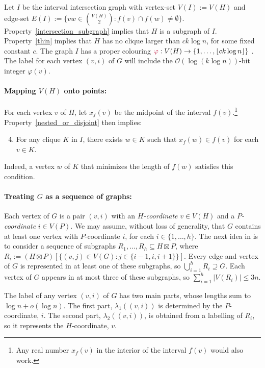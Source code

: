 \documentclass{patmorin}
\makeatletter
\renewcommand{\le}{\leqslant}
\newcommand{\defin}[1]{\emph{\textcolor{brightmaroon}{#1}}}
\def\mathcolor#1#{\@mathcolor{#1}}
\def\@mathcolor#1#2#3{%
  \protect\leavevmode
  \begingroup
    \color#1{#2}#3%
  \endgroup
}
\newcommand{\mathdefin}[1]{\mathcolor{brightmaroon}{#1}}
\newcommand{\Oh}{\calO}
\newcommand{\calO}{\mathcal{O}}
\makeatother
\begin{document}
  Let $I$ be the interval intersection graph with vertex-set $V(I):=V(H)$ and edge-set $E(I):=\{vw\in\binom{V(H)}{2}:f(v)\cap f(w)\neq\emptyset\}$.
  Property~\ref{intersection_subgraph} implies that $H$ is a subgraph of $I$. Property~\ref{thin} implies that $H$ has no clique larger than $ck\log n$, for some fixed constant $c$.
  The graph $I$ has a proper colouring $\mathdefin{\varphi}:V(H)\to\{1,\ldots,\lfloor ck\log n\rfloor\}$ \cite{gilmore.hoffman:characterization}.
  The label for each vertex $(v,i)$ of $G$ will include the $\Oh(\log (k\log n))$-bit integer $\varphi(v)$.

  \paragraph{\boldmath Mapping $V(H)$ onto points:}
  For each vertex $v$ of $H$, let $x_f(v)$ be the midpoint of the interval $f(v)$.\footnote{Any real number $x_f(v)$ in the interior of the interval $f(v)$ would also work.}  Property~\ref{nested_or_disjoint} then implies:
  \begin{enumerate}\setcounter{enumi}{3}
      \item\label{clique_property} For any clique $K$ in $I$, there exists $w\in K$ such that $x_f(w)\in f(v)$ for each $v\in K$.
  \end{enumerate}
  Indeed, a vertex $w$ of $K$ that minimizes the length of $f(w)$ satisfies this condition.

  \paragraph{\boldmath Treating $G$ as a sequence of graphs:}
  Each vertex of $G$ is a pair $(v,i)$ with an \defin{$H$-coordinate} $v\in V(H)$ and a \defin{$P$-coordinate} $i\in V(P)$.
  We may assume, without loss of generality, that $G$ contains at least one vertex with $P$-coordinate $i$, for each $i\in\{1,\ldots,h\}$.
  The next idea in \cite{dujmovic.esperet.ea:adjacency} is to consider a sequence of subgraphs $R_1,\ldots,R_h\subseteq H\boxtimes P$, where $R_i:=(H\boxtimes P)[\{(v,j)\in V(G):j\in\{i-1,i,i+1\}\}]$.
  Every edge and vertex of $G$ is represented in at least one of these subgraphs, so $\bigcup_{i=1}^h R_i\supseteq G$.
  Each vertex of $G$ appears in at most three of these subgraphs, so $\sum_{i=1}^h |V(R_i)|\le 3n$.

  The label of any vertex $(v,i)$ of $G$ has two main parts, whose lengths sum to $\log n+o(\log n)$.
  The first part, $\lambda_1((v,i))$ is determined by the $P$-coordinate, $i$.
  The second part, $\lambda_2((v,i))$, is obtained from a labelling of $R_i$, so it represents the $H$-coordinate, $v$.
\end{document}
